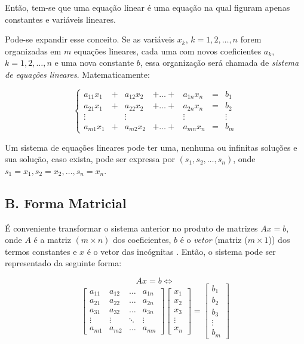 \documentclass[twocolumn, 10pt]{extarticle}
\begin{document}
Então, tem-se que uma equação linear é uma equação na qual figuram apenas constantes e variáveis lineares.

Pode-se expandir esse conceito. Se as variáveis $x_k$, $k = 1, 2, \dots, n$ forem organizadas em $m$ equações lineares, cada uma com novos coeficientes $a_k$, $k = 1, 2, \dots, n$ e uma nova constante $b$, essa organização será chamada de \textit{sistema de equações lineares}. Matematicamente:

\[
\left\{
\begin{aligned}
   a_{11}x_1 & + &  a_{12}x_2 & + \dots + & a_{1n}x_n &= & b_1 \\
   a_{21}x_1 & + &  a_{22}x_2 & + \dots + & a_{2n}x_n &= & b_2 \\
   \vdots &   & \vdots &  &  \vdots  & & \vdots \\
   a_{m1}x_1 & + &  a_{m2}x_2 & + \dots + & a_{mn}x_n &= & b_m 
\end{aligned}
\right.
\]

Um sistema de equações lineares pode ter uma, nenhuma ou infinitas soluções \cite[p. 4]{antonAlgebra} e sua solução, caso exista, pode ser expressa por $(s_1, s_2,\dots, s_n)$, onde $s_1 = x_1, s_2 = x_2, \dots, s_n = x_n$.

\subsection*{B. \quad Forma Matricial}

É conveniente transformar o sistema anterior no produto de matrizes $Ax = b$, onde $A$ é a matriz $(m \times n)$ dos coeficientes, $b$ é o \textit{vetor} (matriz ($m \times 1$)) dos termos constantes e $x$ é o vetor das incógnitas \cite[p. 33]{antonAlgebra}. Então, o sistema pode ser representado da seguinte forma:

\[Ax = b \iff\]
\[ 
\begin{bmatrix}
a_{11} & a_{12} & \dots & a_{1n} \\
a_{21} & a_{22} & \dots & a_{2n} \\
a_{31} & a_{32} & \dots & a_{3n} \\
\vdots & \vdots & \ddots & \vdots \\
a_{m1} & a_{m2} & \dots & a_{mn}  
\end{bmatrix}
\begin{bmatrix}
x_{1}\\
x_{2}\\
x_{3}\\
\vdots\\
x_{n}
\end{bmatrix}
=
\begin{bmatrix}
b_{1}\\
b_{2}\\
b_{3}\\
\vdots\\
b_{m}
\end{bmatrix}
\]
\end{document}
